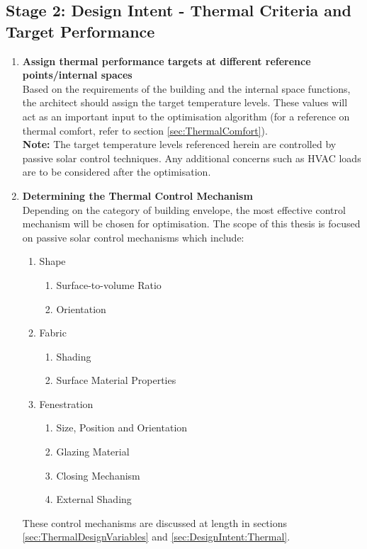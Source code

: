 \clearpage
\colorbox{95Gray}{%
	\begin{minipage}[c][20.5cm][t]{\textwidth}{%
		\subsection{Stage 2: Design Intent - Thermal Criteria and Target Performance}
		\vspace{0.5cm}
		\begin{enumerate}
			\item \textbf{Assign thermal performance targets at different reference points/internal spaces}\\[3mm]
				Based on the requirements of the building and the internal space functions, the architect should assign the target temperature levels. These values will act as an important input to the optimisation algorithm (for a reference on thermal comfort, refer to section \ref{sec:ThermalComfort}).\\[3mm]
				\textbf{Note:} The target temperature levels referenced herein are controlled by passive solar control techniques. Any additional concerns such as HVAC loads are to be considered after the optimisation.
			\item \textbf{Determining the Thermal Control Mechanism}\\[3mm]
				Depending on the category of building envelope, the most effective control mechanism will be chosen for optimisation. The scope of this thesis is focused on passive solar control mechanisms which include:
				\begin{enumerate}
					\item Shape
						\begin{enumerate}
							\item Surface-to-volume Ratio
							\item Orientation
						\end{enumerate}
					\item Fabric
						\begin{enumerate}
							\item Shading
							\item Surface Material Properties
						\end{enumerate}
					\item Fenestration
						\begin{enumerate}
							\item Size, Position and Orientation
							\item Glazing Material
							\item Closing Mechanism
							\item External Shading
						\end{enumerate}
				\end{enumerate}
				These control mechanisms are discussed at length in sections \ref{sec:ThermalDesignVariables} and \ref{sec:DesignIntent:Thermal}.
		\end{enumerate}
	}%
\end{minipage}%
}


